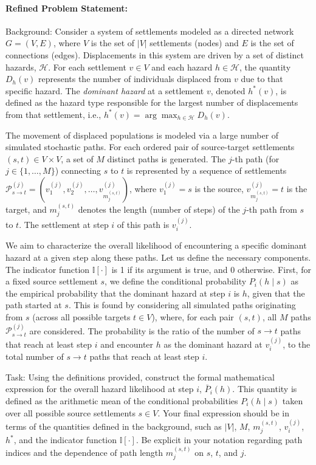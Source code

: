 \documentclass[10pt]{article}
\begin{document}
\paragraph*{Refined Problem Statement:}
Background:  
Consider a system of settlements modeled as a directed network $G=(V,E)$, where $V$ is the set of $|V|$ settlements (nodes) and $E$ is the set of connections (edges). Displacements in this system are driven by a set of distinct hazards, $\mathcal{H}$. For each settlement $v \in V$ and each hazard $h \in \mathcal{H}$, the quantity $D_h(v)$ represents the number of individuals displaced from $v$ due to that specific hazard. The \emph{dominant hazard} at a settlement $v$, denoted $h^*(v)$, is defined as the hazard type responsible for the largest number of displacements from that settlement, i.e., $h^*(v) = \arg\max_{h \in \mathcal{H}} D_h(v)$.

The movement of displaced populations is modeled via a large number of simulated stochastic paths. For each ordered pair of source-target settlements $(s, t) \in V \times V$, a set of $M$ distinct paths is generated. The $j$-th path (for $j \in \{1, \dots, M\}$) connecting $s$ to $t$ is represented by a sequence of settlements $\mathcal{P}^{(j)}_{s \to t} = (v^{(j)}_{1}, v^{(j)}_{2}, \dots, v^{(j)}_{m_{j}^{(s,t)}})$, where $v^{(j)}_{1} = s$ is the source, $v^{(j)}_{m_{j}^{(s,t)}} = t$ is the target, and $m_{j}^{(s,t)}$ denotes the length (number of steps) of the $j$-th path from $s$ to $t$. The settlement at step $i$ of this path is $v^{(j)}_{i}$.

We aim to characterize the overall likelihood of encountering a specific dominant hazard at a given step along these paths. Let us define the necessary components. The indicator function $\mathbb{I}[\cdot]$ is 1 if its argument is true, and 0 otherwise. First, for a fixed source settlement $s$, we define the conditional probability $P_i(h \mid s)$ as the empirical probability that the dominant hazard at step $i$ is $h$, given that the path started at $s$. This is found by considering all simulated paths originating from $s$ (across all possible targets $t \in V$), where, for each pair $(s, t)$, all $M$ paths $\mathcal{P}^{(j)}_{s \to t}$ are considered. The probability is the ratio of the number of $s \to t$ paths that reach at least step $i$ and encounter $h$ as the dominant hazard at $v^{(j)}_{i}$, to the total number of $s \to t$ paths that reach at least step $i$.

Task:
Using the definitions provided, construct the formal mathematical expression for the overall hazard likelihood at step $i$, $\bar{P}_i(h)$. This quantity is defined as the arithmetic mean of the conditional probabilities $P_i(h \mid s)$ taken over all possible source settlements $s \in V$. Your final expression should be in terms of the quantities defined in the background, such as $|V|$, $M$, $m_j^{(s,t)}$, $v^{(j)}_{i}$, $h^*$, and the indicator function $\mathbb{I}[\cdot]$. Be explicit in your notation regarding path indices and the dependence of path length $m^{(s,t)}_{j}$ on $s$, $t$, and $j$.
\end{document}
